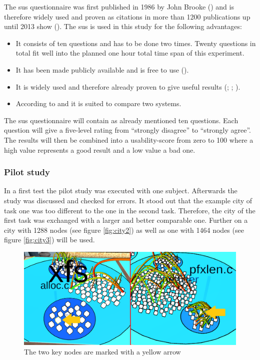 The \gls{sus} questionnaire was first published in 1986 by John Brooke (\cite{brooke1996sus}) and is therefore widely used and proven as citations in more than 1200 publications up until 2013 show (\cite{brooke2013}).
The \gls{sus} is used in this study for the following advantages: 
\begin{itemize}
  \item It consists of ten questions and has to be done two times. Twenty questions in total fit well into the planned one hour total time span of this experiment.
  \item It has been made publicly available and is free to use (\cite{brooke1996sus}).
  \item It is widely used and therefore already proven to give useful results (\cite{brooke2013}; \cite{lewis2018system}; \cite{grier2013system}).
  \item According to \cite{doi:10.1177/1541931213571043} and \cite{doi:10.1080/10447310802205776} it is suited to compare two systems.
\end{itemize}
The \gls{sus} questionnaire will contain as already mentioned ten questions.
Each question will give a five-level rating from \enquote{strongly disagree} to \enquote{strongly agree}.
The results will then be combined into a \gls{usability}-score from zero to 100 where a high value represents a good result and a low value a bad one.
\subsubsection{Pilot study}
\label{pilot}
In a first test the pilot study was executed with one subject.
Afterwards the study was discussed and checked for errors.
It stood out that the example \gls{city} of task one was too different to the one in the second task.
Therefore, the \gls{city} of the first task was exchanged with a larger and better comparable one.
Further on a \gls{city} with 1288 nodes (see figure \ref{fig:city2}) as well as one with 1464 nodes (see figure \ref{fig:city3}) will be used.

\begin{figure}[htb]
  \centering
  \includegraphics[width=1\textwidth]{Evaluation/img/task1.png}
  \caption{The two key nodes are marked with a yellow arrow}\label{fig:task1}
\end{figure}

